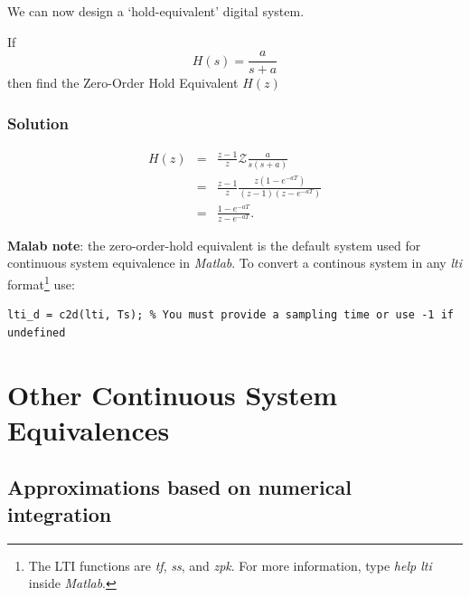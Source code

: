 We can now design a `hold-equivalent' digital system.

\ifslidesonly
\begin{slide}

\end{slide}
\fi


\begin{slide}\label{slide:l11s11}
  If \[H(s) = \frac{a}{s+a}\] then find the Zero-Order Hold Equivalent $H(z)$
\end{slide}

\subsubsection*{Solution}
\begin{eqnarray*}
  H(z) &=& \frac{z-1}{z}\mathcal{Z} \frac{a}{s(s+a)}\\
       &=& \frac{z-1}{z} \frac{z(1-e^{-aT})}{(z-1)(z-e^{-aT})}\\
       &=& \frac{1-e^{-aT}}{z-e^{-aT}}.
\end{eqnarray*}

\textbf{Malab note}: the zero-order-hold equivalent is the default
system used for continuous system equivalence in \emph{Matlab}. To
convert a continous system in any \emph{lti} format\footnote{%
The LTI functions are \emph{tf}, \emph{ss}, and \emph{zpk}. For more
information, type \emph{help lti} inside \emph{Matlab}.} use:
\begin{verbatim}
lti_d = c2d(lti, Ts); % You must provide a sampling time or use -1 if undefined
\end{verbatim}

\section*{Other Continuous System Equivalences}

\subsection*{Approximations based on numerical integration}

\ifslidesonly
\begin{slide}

\end{slide}
\fi


